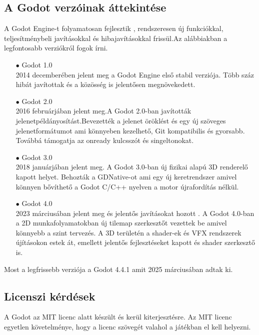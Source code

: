 \documentclass[
]{thesis-ekf}
\theoremstyle{definition}
\theoremstyle{remark}
\begin{document}
\subsection{A Godot verzóinak áttekintése}
A Godot Engine-t folyamatosan fejlesztik , rendszeresen új funkciókkal, teljesítménybeli javításokkal és hibajavításokkal frissül.Az alábbiakban a legfontosabb verziókról fogok írni.
\begin{itemize}
	\item[$\bullet$] Godot 1.0 \\ 2014 decemberében jelent meg a Godot Engine első stabil verziója. Több száz hibát javítottak és a közösség is jelentősen megnövekedett.
	\item[$\bullet$] Godot 2.0 \\ 2016 februárjában jelent meg.A Godot 2.0-ban javították jelenetpéldányosítást.Bevezették a jelenet öröklést és egy új szöveges jelenetformátumot ami könnyeben kezelhető, Git kompatibilis és gyorsabb. Továbbá támogatja az onready kulcsszót és singeltonokat.
	\item[$\bullet$] Godot 3.0 \\ 2018 januárjában jelent meg. A Godot 3.0-ban új fizikai alapú 3D renderelő kapott helyet. Behozták a GDNative-ot  ami egy új keretrendszer amivel könnyen bővíthető a Godot C/C++ nyelven a motor újrafordítás nélkül.
	\item [$\bullet$] Godot 4.0\\  2023 márciusában jelent meg és jelentős javításokat hozott .  A Godot 4.0-ban a 2D munkafolyamatokban új tilemap szerkesztőt vezettek be amivel könnyebb a szint tervezés. A 3D területén a shader-ek és VFX rendszerek újításokon estek át, emellett jelentős fejlesztéseket kapott és shader szerkesztő is.
\end{itemize}
Most a legfrissebb verziója a Godot 4.4.1 amit 2025 márciusában adtak ki.
\subsection{Licenszi kérdések}
A Godot az MIT licenc alatt készült és kerül kiterjesztésre. Az MIT licenc egyetlen követelménye, hogy a licenc szövegét valahol a játékban el kell helyezni.
\end{document}
